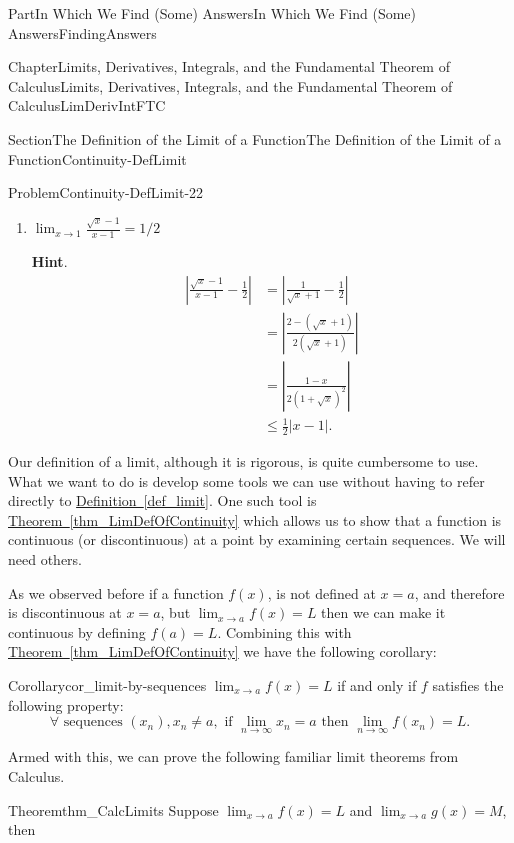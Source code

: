 \documentclass[oneside,10pt,]{book}
\newcommand{\blocktitlefont}{\relax}
\newcommand{\xreffont}{\relax}
\numberwithin{equation}{part}
\newcommand{\abs}[1]{\left|#1\right|}
\def\limit#1#2#3{{\displaystyle\lim_{#1\rightarrow #2}#3}}
\newcommand{\amp}{&}
\begin{document}
\begin{partptx}{Part}{In Which We Find (Some) Answers}{}{In Which We Find (Some) Answers}{}{}{FindingAnswers}
\begin{chapterptx}{Chapter}{Limits, Derivatives, Integrals, and the Fundamental Theorem of Calculus}{}{Limits, Derivatives, Integrals, and the Fundamental Theorem of Calculus}{}{}{LimDerivIntFTC}
\begin{sectionptx}{Section}{The Definition of the Limit of a Function}{}{The Definition of the Limit of a Function}{}{}{Continuity-DefLimit}
\begin{problem}{Problem}{}{Continuity-DefLimit-22}
\begin{enumerate}[font=\bfseries,label=(\alph*),ref=\alph*]
\begin{align*}
\amp =\abs{(x-1)^2+2(x-1)}+\abs{x-1} \\
\amp
\leq\abs{x-1}^2 + 3\abs{x-1} \text{.}
\end{align*}
%
\item{}\(\limit{x}{1}{\frac{\sqrt{x}-1}{x-1}}=1/2\)%
\par\smallskip%
\noindent\textbf{\blocktitlefont Hint}.\hypertarget{Continuity-DefLimit-22-4-2}{}\quad{}%
\begin{align*}
\abs{\frac{\sqrt{x}-1}{x-1}-\frac12}\amp =
\abs{\frac{1}{\sqrt{x}+1}-\frac12} \\
\amp
=\abs{\frac{2-\left(\sqrt{x}+1\right)}{2\left(\sqrt{x}+1\right)}}\\
\amp
=\abs{\frac{1-x}{2\left(1+\sqrt{x}\right)^2}} \\
\amp \leq\frac12\abs{x-1}.  
\end{align*}
%
\end{enumerate}%
\end{problem}
Our definition of a limit, although it is rigorous, is quite cumbersome to use. What we want to do is develop some tools we can use without having to refer directly to \hyperref[def_limit]{Definition~{\xreffont\ref{def_limit}}}.  One such tool is \hyperref[thm_LimDefOfContinuity]{Theorem~{\xreffont\ref{thm_LimDefOfContinuity}}} which allows us to show that a function is continuous (or discontinuous) at a point by examining certain sequences. We will need others.%
\par
As we  observed before if a function \(f(x)\), is not defined at \(x=a\), and therefore is discontinuous at \(x=a\), but \(\limit{x}{a}{f(x)}=L \) then we can make it continuous by defining \(f(a)=L\). Combining this with \hyperref[thm_LimDefOfContinuity]{Theorem~{\xreffont\ref{thm_LimDefOfContinuity}}} we have the following corollary:                 %
\begin{corollary}{Corollary}{}{}{cor_limit-by-sequences}%
\(\limit{x}{a}{f(x)}=L\) if and only if \(f\) satisfies the following property:%
\begin{equation*}
\forall \text{ sequences } (x_n),
x_n\ne a, \text{ if } \limit{n}{\infty}{x_n}=a \text{ then }
\limit{n}{\infty}{f(x_n)}=L. {} 
\end{equation*}
%
\end{corollary}
Armed with this, we can prove the following familiar limit theorems from Calculus.%
\begin{theorem}{Theorem}{}{}{thm_CalcLimits}%
 Suppose \(\limit{x}{a}{f(x)}=L\) and \(\limit{x}{a}{g(x)}=M\), then%

\end{theorem}
\end{sectionptx}
\end{chapterptx}
\end{partptx}
\end{document}
